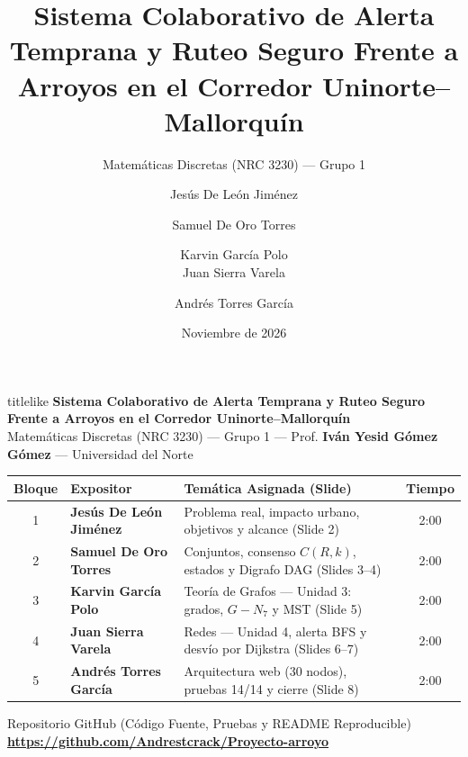 \documentclass[aspectratio=169]{beamer}
\title[Alerta Temprana y Ruteo de Arroyos]{Sistema Colaborativo de Alerta Temprana y Ruteo Seguro Frente a Arroyos en el Corredor Uninorte--Mallorquín}
\subtitle{Matemáticas Discretas (NRC 3230) --- Grupo 1}
\author[Grupo 1]{%
    Jesús De León Jiménez \and Samuel De Oro Torres \and Karvin García Polo \\
    Juan Sierra Varela \and Andrés Torres García%
}
\institute[Uninorte]{%
    Universidad del Norte --- Prof. \textbf{Iván Yesid Gómez Gómez}
}
\date{Noviembre de 2026}
\begin{document}
\begin{frame}[plain]
    \vspace{-0.15cm}
    \begin{beamercolorbox}[sep=6pt,center,rounded=true,shadow=true]{titlelike}
        {\large \textbf{Sistema Colaborativo de Alerta Temprana y Ruteo Seguro Frente a Arroyos en el Corredor Uninorte--Mallorquín}} \\[0.1cm]
        {\scriptsize Matemáticas Discretas (NRC 3230) --- Grupo 1 --- Prof. \textbf{Iván Yesid Gómez Gómez} --- Universidad del Norte}
    \end{beamercolorbox}

    \vspace{0.18cm}
    \scriptsize
    \centering
    \setlength{\tabcolsep}{5pt}
    \begin{tabular}{@{}cllc@{}}
        \toprule
        \textbf{Bloque} & \textbf{Expositor} & \textbf{Temática Asignada (Slide)} & \textbf{Tiempo} \\
        \midrule
        1 & \textbf{Jesús De León Jiménez} & Problema real, impacto urbano, objetivos y alcance (Slide 2) & 2:00 \\
        2 & \textbf{Samuel De Oro Torres} & Conjuntos, consenso $C(R,k)$, estados y Digrafo DAG (Slides 3--4) & 2:00 \\
        3 & \textbf{Karvin García Polo} & Teoría de Grafos --- Unidad 3: grados, $G - N_7$ y MST (Slide 5) & 2:00 \\
        4 & \textbf{Juan Sierra Varela} & Redes --- Unidad 4, alerta BFS y desvío por Dijkstra (Slides 6--7) & 2:00 \\
        5 & \textbf{Andrés Torres García} & Arquitectura web (30 nodos), pruebas 14/14 y cierre (Slide 8) & 2:00 \\
        \bottomrule
    \end{tabular}

    \vspace{0.18cm}
    \begin{block}{Repositorio GitHub (Código Fuente, Pruebas y README Reproducible)}
        \centering \footnotesize
        \textbf{\url{https://github.com/Andrestcrack/Proyecto-arroyo}}
    \end{block}
\end{frame}
\end{document}

